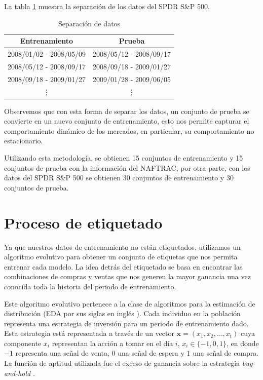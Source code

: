 \documentclass[12pt]{scrbook}
\theoremstyle{break}
\theoremstyle{break}
\newcommand{\buyhold}{\textit{buy-and-hold }}
\begin{document}
La tabla \ref{tabla:data split SP500} muestra la separación de los datos del SPDR S\&P 500.
\begin{table}[h]
\centering
\begin{tabular}{cc}
\hline
\textbf{Entrenamiento} & \textbf{Prueba} \\
\hline
2008/01/02 - 2008/05/09 & 2008/05/12 - 2008/09/17 \\
2008/05/12 - 2008/09/17 & 2008/09/18 - 2009/01/27 \\
2008/09/18 - 2009/01/27 & 2009/01/28 - 2009/06/05 \\
\vdots & \vdots \\
\hline
\end{tabular}
\caption{\label{tabla:data split SP500} Separación de datos}
\end{table}

Observemos que con esta forma de separar los datos, un conjunto de prueba se convierte en un nuevo conjunto de entrenamiento, esto nos permite capturar el comportamiento dinámico de los mercados, en particular, su comportamiento no estacionario.

Utilizando esta metodología, se obtienen 15 conjuntos de entrenamiento y 15 conjuntos de prueba con la información del NAFTRAC, por otra parte, con los datos del SPDR S\&P 500 se obtienen 30 conjuntos de entrenamiento y 30 conjuntos de prueba.



\section{Proceso de etiquetado}
\label{seccion:proceso etiquetado}
Ya que nuestros datos de entrenamiento no están etiquetados, utilizamos un algoritmo evolutivo para obtener un conjunto de etiquetas que nos permita entrenar cada modelo. La idea detrás del etiquetado se basa en encontrar las combinaciones de compras y ventas que nos generen la mayor ganancia una vez conocida toda la historia del periodo de entrenamiento.

Este algoritmo evolutivo pertenece a la clase de algoritmos para la estimación de distribución (EDA por sus siglas en inglés \cite{simon2013evolutionary}). Cada individuo en la población representa una estrategia de inversión para un periodo de entrenamiento dado. Esta estrategia está representada a través de un vector $\mathbf{x} = (x_1, x_2, \ldots, x_t)$ cuya componente $x_i$ representan la acción a tomar en el día $i$, $x_i \in \{-1,0,1\}$, en donde $-1$ representa una señal de venta, $0$ una señal de espera y $1$ una señal de compra. La función de aptitud utilizada fue el exceso de ganancia sobre la estrategia \buyhold.
\end{document}

